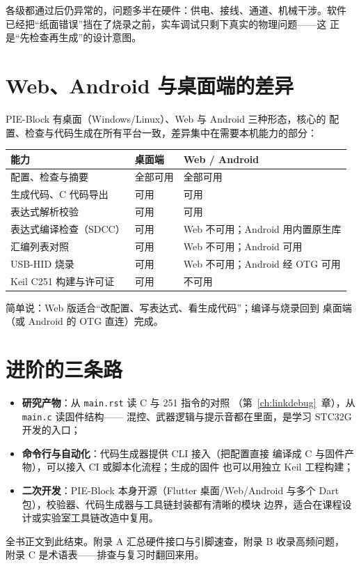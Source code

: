 各级都通过后仍异常的，问题多半在硬件：供电、接线、通道、机械干涉。软件
已经把“纸面错误”挡在了烧录之前，实车调试只剩下真实的物理问题——这
正是“先检查再生成”的设计意图。

\section{Web、Android 与桌面端的差异}

PIE-Block 有桌面（Windows/Linux）、Web 与 Android 三种形态，核心的
配置、检查与代码生成在所有平台一致，差异集中在需要本机能力的部分：

\begin{center}
\begin{tabular}{@{}lll@{}}
\toprule
能力 & 桌面端 & Web / Android \\
\midrule
配置、检查与摘要 & 全部可用 & 全部可用 \\
生成代码、C 代码导出 & 可用 & 可用 \\
表达式解析校验 & 可用 & 可用 \\
表达式编译检查（SDCC） & 可用 & Web 不可用；Android 用内置原生库 \\
汇编列表对照 & 可用 & Web 不可用；Android 可用 \\
USB-HID 烧录 & 可用 & Web 不可用；Android 经 OTG 可用 \\
Keil C251 构建与许可证 & 可用 & 不可用 \\
\bottomrule
\end{tabular}
\end{center}

简单说：Web 版适合“改配置、写表达式、看生成代码”；编译与烧录回到
桌面端（或 Android 的 OTG 直连）完成。

\section{进阶的三条路}

\begin{itemize}
  \item \textbf{研究产物}：从 \texttt{main.rst} 读 C 与 251 指令的对照
        （第~\ref{ch:linkdebug}~章），从 \texttt{main.c} 读固件结构——
        混控、武器逻辑与提示音都在里面，是学习 STC32G 开发的入口；
  \item \textbf{命令行与自动化}：代码生成器提供 CLI 接入（把配置直接
        编译成 C 与固件产物），可以接入 CI 或脚本化流程；生成的固件
        也可以用独立 Keil 工程构建；
  \item \textbf{二次开发}：PIE-Block 本身开源（Flutter 桌面/Web/Android
        与多个 Dart 包），校验器、代码生成器与工具链封装都有清晰的模块
        边界，适合在课程设计或实验室工具链改造中复用。
\end{itemize}

全书正文到此结束。附录 A 汇总硬件接口与引脚速查，附录 B 收录高频问题，
附录 C 是术语表——排查与复习时翻回来用。
